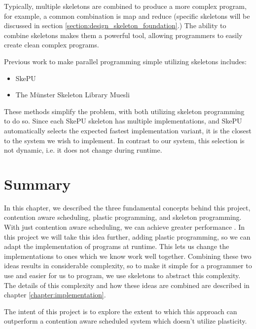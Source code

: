 Typically, multiple skeletons are combined to produce a more complex program, for example, a common combination is map and reduce (specific skeletons will be discussed in section \ref{section:design_skeleton_foundation}.) The ability to combine skeletons makes them a powerful tool, allowing programmers to easily create clean complex programs.

Previous work to make parallel programming simple utilizing skeletons includes:

\begin{itemize}
	\item SkePU
	\item The Münster Skeleton Library Muesli
\end{itemize}

These methods simplify the problem, with both utilizing skeleton programming to do so. Since each SkePU skeleton has multiple implementations, and SkePU automatically selects the expected fastest implementation variant, it is the closest to the system we wish to implement. In contrast to our system, this selection is not dynamic, i.e. it does not change during runtime. 



\section{Summary}

In this chapter, we described the three fundamental concepts behind this project, contention aware scheduling, plastic programming, and skeleton programming. With just contention aware scheduling, we can achieve greater performance \cite{lira}. In this project we will take this idea further, adding plastic programming, so we can adapt the implementation of programs at runtime. This lets us change the implementations to ones which we know work well together. Combining these two ideas results in considerable complexity, so to make it simple for a programmer to use and easier for us to program, we use skeletons to abstract this complexity. The details of this complexity and how these ideas are combined are described in chapter \ref{chapter:implementation}.

The intent of this project is to explore the extent to which this approach can outperform a contention aware scheduled system which doesn't utilize plasticity.